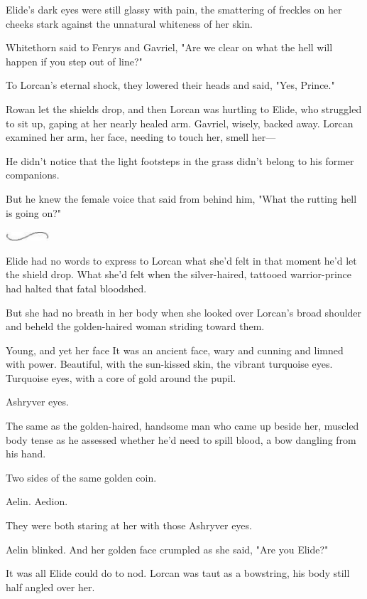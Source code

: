 Elide's dark eyes were still glassy with pain, the smattering of freckles on her cheeks stark against the unnatural whiteness of her skin.

Whitethorn said to Fenrys and Gavriel, "Are we clear on what the hell will happen if you step out of line?"

To Lorcan's eternal shock, they lowered their heads and said, "Yes, Prince."

Rowan let the shields drop, and then Lorcan was hurtling to Elide, who struggled to sit up, gaping at her nearly healed arm. Gavriel, wisely, backed away. Lorcan examined her arm, her face, needing to touch her, smell her---

He didn't notice that the light footsteps in the grass didn't belong to his former companions.

But he knew the female voice that said from behind him, "What the rutting hell is going on?"

\includegraphics[width=0.65in,height=0.13in]{images/seperator}

Elide had no words to express to Lorcan what she'd felt in that moment he'd let the shield drop. What she'd felt when the silver-haired, tattooed warrior-prince had halted that fatal bloodshed.

But she had no breath in her body when she looked over Lorcan's broad shoulder and beheld the golden-haired woman striding toward them.

Young, and yet her face  It was an ancient face, wary and cunning and limned with power. Beautiful, with the sun-kissed skin, the vibrant turquoise eyes. Turquoise eyes, with a core of gold around the pupil.

Ashryver eyes.

The same as the golden-haired, handsome man who came up beside her, muscled body tense as he assessed whether he'd need to spill blood, a bow dangling from his hand.

Two sides of the same golden coin.

Aelin. Aedion.

They were both staring at her with those Ashryver eyes.

Aelin blinked. And her golden face crumpled as she said, "Are you Elide?"

It was all Elide could do to nod. Lorcan was taut as a bowstring, his body still half angled over her.

